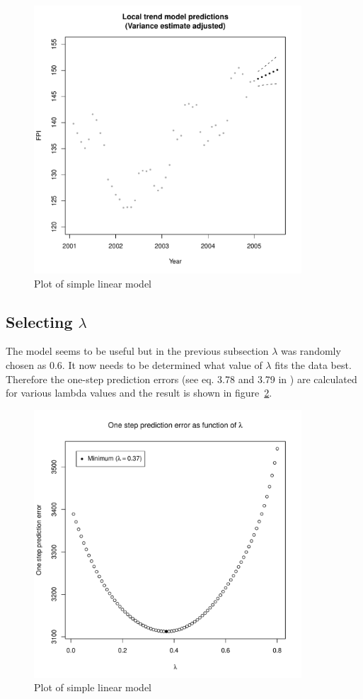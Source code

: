 \documentclass[11pt]{article}
\begin{document}
\begin{figure}
    \centering
    \includegraphics[width=100mm]{local-trend-predict-adjusted-6.pdf}
    \caption{Plot of simple linear model}
    \label{fig:local-trend-model-adjusted}
\end{figure}


\subsection*{Selecting $\lambda$}
The model seems to be useful but in the previous subsection $\lambda$ was randomly chosen as 0.6. It now needs to be determined what value of $\lambda$ fits the data best. Therefore the one-step prediction errors (see eq. 3.78 and 3.79 in \cite{hm}) are calculated for various lambda values and the result is shown in figure~\ref{fig:prediction-errors}.

\begin{figure}
    \centering
    \includegraphics[width=100mm]{prediction-errors.pdf}
    \caption{Plot of simple linear model}
    \label{fig:prediction-errors}
\end{figure}
\end{document}
